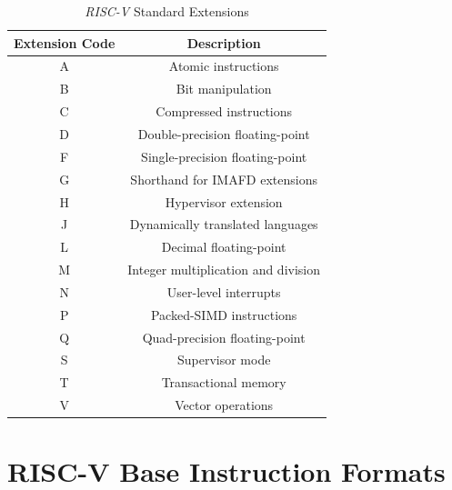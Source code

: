 \begin{table}
  \centering
  \begin{tabular}{|c|c|}
    \hline
    \textbf{Extension Code} & \textbf{Description}                \\
    \hline
    A                       & Atomic instructions                 \\
    \hline
    B                       & Bit manipulation                    \\
    \hline
    C                       & Compressed instructions             \\
    \hline
    D                       & Double-precision floating-point     \\
    \hline
    F                       & Single-precision floating-point     \\
    \hline
    G                       & Shorthand for IMAFD extensions      \\
    \hline
    H                       & Hypervisor extension                \\
    \hline
    J                       & Dynamically translated languages    \\
    \hline
    L                       & Decimal floating-point              \\
    \hline
    M                       & Integer multiplication and division \\
    \hline
    N                       & User-level interrupts               \\
    \hline
    P                       & Packed-SIMD instructions            \\
    \hline
    Q                       & Quad-precision floating-point       \\
    \hline
    S                       & Supervisor mode                     \\
    \hline
    T                       & Transactional memory                \\
    \hline
    V                       & Vector operations                   \\
    \hline
  \end{tabular}
  \caption{\textit{RISC-V} Standard Extensions}
  \label{tab:extensions}
\end{table}

\section{RISC-V Base Instruction Formats}
\label{sec:riscv_bif}

